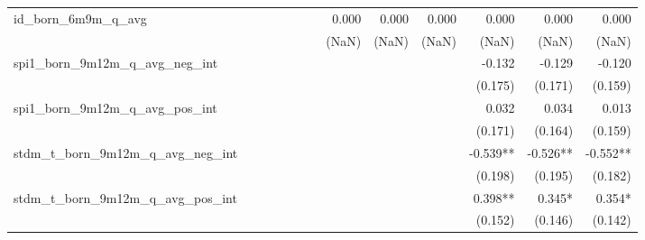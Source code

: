 \begin{tabular}{lrrrrrrrrrrrr}
id\_born\_6m9m\_q\_avg                      &              &              &              &              &              &              &        0.000 &        0.000 &        0.000 &        0.000 &        0.000 &        0.000 \\ 
                                            &              &              &              &              &              &              &        (NaN) &        (NaN) &        (NaN) &        (NaN) &        (NaN) &        (NaN) \\ 
spi1\_born\_9m12m\_q\_avg\_neg\_int         &              &              &              &              &              &              &              &              &              &       -0.132 &       -0.129 &       -0.120 \\ 
                                            &              &              &              &              &              &              &              &              &              &      (0.175) &      (0.171) &      (0.159) \\ 
spi1\_born\_9m12m\_q\_avg\_pos\_int         &              &              &              &              &              &              &              &              &              &        0.032 &        0.034 &        0.013 \\ 
                                            &              &              &              &              &              &              &              &              &              &      (0.171) &      (0.164) &      (0.159) \\ 
stdm\_t\_born\_9m12m\_q\_avg\_neg\_int      &              &              &              &              &              &              &              &              &              &     -0.539** &     -0.526** &     -0.552** \\ 
                                            &              &              &              &              &              &              &              &              &              &      (0.198) &      (0.195) &      (0.182) \\ 
stdm\_t\_born\_9m12m\_q\_avg\_pos\_int      &              &              &              &              &              &              &              &              &              &      0.398** &       0.345* &       0.354* \\ 
                                            &              &              &              &              &              &              &              &              &              &      (0.152) &      (0.146) &      (0.142) \\ 

\end{tabular}
